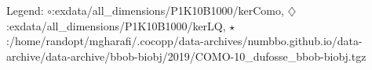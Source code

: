 Legend: {\color{NavyBlue}$\circ$}:exdata/all\_dimensions/P1K10B1000/kerComo, {\color{Magenta}$\diamondsuit$}:exdata/all\_dimensions/P1K10B1000/kerLQ, {\color{Orange}$\star$}:/home/randopt/mgharafi/.cocopp/data-archives/numbbo.github.io/data-archive/data-archive/bbob-biobj/2019/COMO-10\_dufosse\_bbob-biobj.tgz